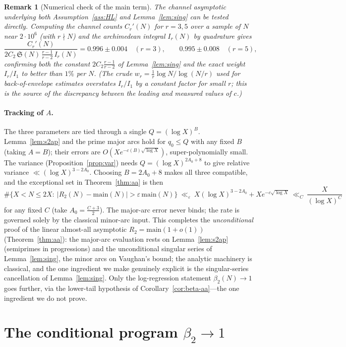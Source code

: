 \documentclass[]{interact}%
\newtheorem{remark}{Remark}
\newcommand{\sing}{\mathfrak S}
\begin{document}
\begin{remark}[Numerical check of the main term]
The channel asymptotic underlying both Assumption~\ref{ass:HL} and Lemma~\ref{lem:sing}
can be tested directly. Computing the channel counts $C_r'(N)$ for $r=3,5$ over a sample
of $N$ near $2\cdot10^{6}$ (with $r\nmid N$) and the archimedean integral $I_r(N)$ by
quadrature gives
\[
  \frac{C_r'(N)}{2C_2\,\sing(N)\,\tfrac{r-1}{r-2}\,I_r(N)}=0.996\pm0.004\quad(r=3),
  \qquad 0.995\pm0.008\quad(r=5),
\]
confirming both the constant $2C_2\tfrac{r-1}{r-2}$ of Lemma~\ref{lem:sing} and the
exact weight $I_r/I_1$ to better than $1\%$ per $N$. (The crude
$w_r=\tfrac1r\log N/\log(N/r)$ used for back-of-envelope estimates overstates
$I_r/I_1$ by a constant factor for small $r$; this is the source of the discrepancy
between the leading and measured values of $c$.)
\end{remark}

\paragraph{Tracking of $A$.}
The three parameters are tied through a single $Q=(\log X)^{B}$. Lemma~\ref{lem:s2ap} and
the prime major arcs hold for $q_0\le Q$ with any fixed $B$ (taking $A=B$); their errors
are $O(Xe^{-c(B)\sqrt{\log X}})$, super-polynomially small. The variance
(Proposition~\ref{prop:var}) needs $Q=(\log X)^{2A_0+8}$ to give relative variance
$\ll(\log X)^{3-2A_0}$. Choosing $B=2A_0+8$ makes all three compatible, and the
exceptional set in Theorem~\ref{thm:aa} is then
\[
  \#\{X<N\le 2X:\ |R_2(N)-\mathrm{main}(N)|>\varepsilon\,\mathrm{main}(N)\}
  \ \ll_{\varepsilon}\ X(\log X)^{3-2A_0}+Xe^{-c\sqrt{\log X}}
  \ \ll_{C}\ \frac{X}{(\log X)^{C}}
\]
for any fixed $C$ (take $A_0=\tfrac{C+3}2$). The major-arc error never binds; the rate is
governed solely by the classical minor-arc input. This completes the \emph{unconditional}
proof of the linear almost-all asymptotic $R_2=\mathrm{main}(1+o(1))$ (Theorem~\ref{thm:aa}):
the major-arc evaluation rests on Lemma~\ref{lem:s2ap} (semiprimes in progressions) and the
unconditional singular series of Lemma~\ref{lem:sing}, the minor arcs on Vaughan's bound; the
analytic machinery is classical, and the one ingredient we make genuinely explicit is the
singular-series cancellation of Lemma~\ref{lem:sing}. Only the log-regression statement
$\beta_2(N)\to1$ goes further, via the lower-tail hypothesis of Corollary~\ref{cor:beta-aa}---the
one ingredient we do not prove.


\section{The conditional program $\beta_2\to1$}
\label{app:conditional}
\end{document}
